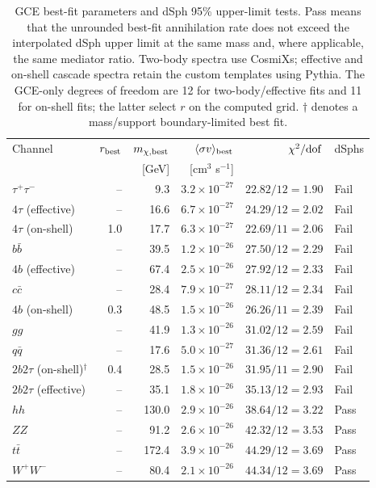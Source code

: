 \documentclass[superscriptaddress,
showpacs,preprintnumbers,nofootinbib,eqsecnum,amsmath,amssymb,aps,11pt, groupedaddress, floatfix]{revtex4-2}
\begin{document}
\begin{table}[tb]
\centering
\small
\begin{tabular}{lrrrrl}
\hline
Channel & $r_{\rm best}$ & $m_{\chi,\rm best}$ & $\langle\sigma v\rangle_{\rm best}$ & $\chi^2/{\rm dof}$ & dSphs \\
 & & [GeV] & [cm$^3$ s$^{-1}$] & & \\
\hline
$\tau^+\tau^-$ & -- & 9.3 & $3.2\times10^{-27}$ & $22.82/12=1.90$ & Fail \\
$4\tau$ (effective) & -- & 16.6 & $6.7\times10^{-27}$ & $24.29/12=2.02$ & Fail \\
$4\tau$ (on-shell) & 1.0 & 17.7 & $6.3\times10^{-27}$ & $22.69/11=2.06$ & Fail \\
$b\bar b$ & -- & 39.5 & $1.2\times10^{-26}$ & $27.50/12=2.29$ & Fail \\
$4b$ (effective) & -- & 67.4 & $2.5\times10^{-26}$ & $27.92/12=2.33$ & Fail \\
$c\bar c$ & -- & 28.4 & $7.9\times10^{-27}$ & $28.11/12=2.34$ & Fail \\
$4b$ (on-shell) & 0.3 & 48.5 & $1.5\times10^{-26}$ & $26.26/11=2.39$ & Fail \\
$gg$ & -- & 41.9 & $1.3\times10^{-26}$ & $31.02/12=2.59$ & Fail \\
$q\bar q$ & -- & 17.6 & $5.0\times10^{-27}$ & $31.36/12=2.61$ & Fail \\
$2b2\tau$ (on-shell)$^{\dagger}$ & 0.4 & 28.5 & $1.5\times10^{-26}$ & $31.95/11=2.90$ & Fail \\
$2b2\tau$ (effective) & -- & 35.1 & $1.8\times10^{-26}$ & $35.13/12=2.93$ & Fail \\
$hh$ & -- & 130.0 & $2.9\times10^{-26}$ & $38.64/12=3.22$ & Pass \\
$ZZ$ & -- & 91.2 & $2.6\times10^{-26}$ & $42.32/12=3.53$ & Pass \\
$t\bar t$ & -- & 172.4 & $3.9\times10^{-26}$ & $44.29/12=3.69$ & Pass \\
$W^+W^-$ & -- & 80.4 & $2.1\times10^{-26}$ & $44.34/12=3.69$ & Pass \\
\hline
\end{tabular}
\caption{\justifying
GCE best-fit parameters and dSph 95\% upper-limit tests. Pass means that the unrounded best-fit annihilation rate does not exceed the interpolated dSph upper limit at the same mass and, where applicable, the same mediator ratio. Two-body spectra use CosmiXs; effective and on-shell cascade spectra retain the custom templates using Pythia. The GCE-only degrees of freedom are 12 for two-body/effective fits and 11 for on-shell fits; the latter select $r$ on the computed grid. $\dagger$ denotes a mass/support boundary-limited best fit.}
\label{tab:gce-bestfits-dsph}
\end{table}
\end{document}
